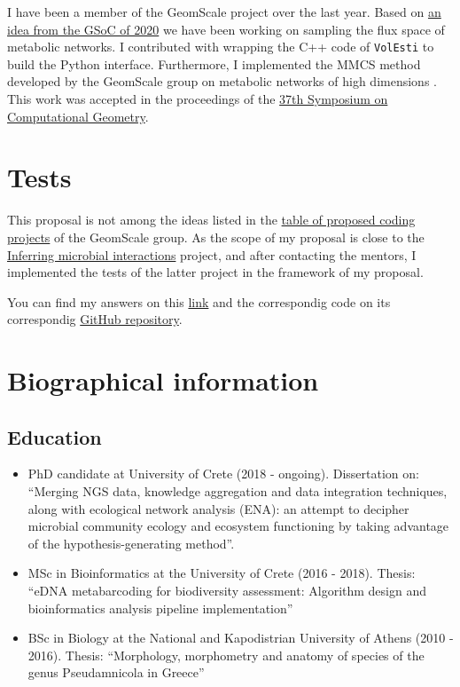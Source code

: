 \documentclass{article}
\begin{document}
I have been a member of the GeomScale project over the last year.
Based on \href{https://github.com/GeomScale/gsoc2020/wiki/High-dimensional-sampling-with-applications-to-structural-biology}{an idea from the GSoC of 2020} we have been working on sampling the flux space of metabolic networks. 
I contributed with wrapping the C++ code of \texttt{VolEsti} to build the Python interface.
Furthermore, I implemented the MMCS method developed by the GeomScale group on metabolic networks of high dimensions \cite{chalkis2020geometric}. 
This work was accepted in the proceedings of the \href{https://cse.buffalo.edu/socg21/accepted.html}{37th Symposium on Computational Geometry}.



\section{Tests}
This proposal is not among the ideas listed in the 
\href{https://github.com/GeomScale/gsoc2021/wiki/table-of-proposed-coding-projects}{table of proposed coding projects} of the GeomScale group. 
As the scope of my proposal is close to the \href{https://github.com/GeomScale/gsoc2021/wiki/Inferring-microbial-interactions}{Inferring microbial interactions} project, 
and after contacting the mentors, 
I implemented the tests of the latter project in the framework of my proposal.

You can find my answers on this \href{https://hariszaf.github.io/gsoc2021/}{link} 
and the correspondig code on its correspondig \href{https://github.com/hariszaf/gsoc2021}{GitHub repository}.



\section{Biographical information}
\subsection{Education}

\begin{itemize}

   \item PhD candidate at University of Crete (2018 - ongoing). Dissertation on: “Merging NGS data, knowledge aggregation and data integration techniques, along with ecological network analysis (ENA): an attempt to decipher microbial community ecology and ecosystem functioning by taking advantage of the hypothesis-generating method”.
   \item MSc in Bioinformatics at the University of Crete (2016 - 2018). Thesis: “eDNA metabarcoding for biodiversity assessment: Algorithm design and bioinformatics analysis pipeline implementation”
   \item BSc in Biology at the National and Kapodistrian University of Athens (2010 - 2016). Thesis: “Morphology, morphometry and anatomy of species of the genus Pseudamnicola in Greece” 

\end{itemize}
\end{document}
